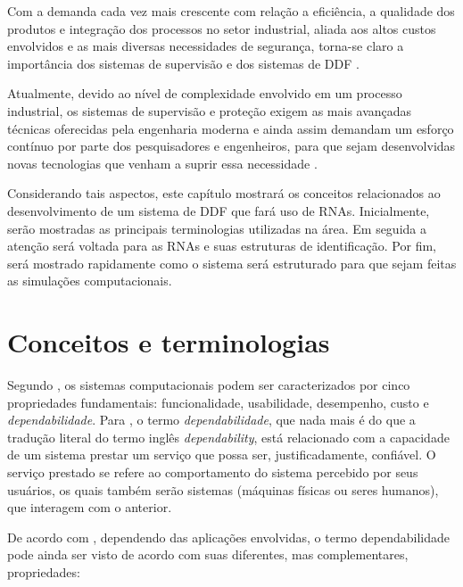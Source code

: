 \label{cap:aspectos}

Com a demanda cada vez mais crescente com relação a eficiência, a qualidade dos
produtos e integração dos processos no setor industrial, aliada aos altos custos
envolvidos e as mais diversas necessidades de segurança, torna-se claro a
importância dos sistemas de supervisão e dos sistemas de DDF
\cite{isermann:2006}.

Atualmente, devido ao nível de complexidade envolvido em um processo industrial,
os sistemas de supervisão e proteção exigem as mais avançadas técnicas
oferecidas pela engenharia moderna e ainda assim demandam um esforço contínuo
por parte dos pesquisadores e engenheiros, para que sejam desenvolvidas novas
tecnologias que venham a suprir essa necessidade \cite{silva:2008}.

Considerando tais aspectos, este capítulo mostrará os conceitos relacionados ao
desenvolvimento de um sistema de DDF que fará uso de RNAs. Inicialmente, serão
mostradas as principais terminologias utilizadas na área. Em seguida a atenção
será voltada para as RNAs e suas estruturas de identificação. Por fim, será
mostrado rapidamente como o sistema será estruturado para que sejam feitas as
simulações computacionais.

\section{Conceitos e terminologias}\label{sec:propriedades}
Segundo , os sistemas computacionais podem ser
caracterizados por cinco propriedades fundamentais: funcionalidade, usabilidade,
desempenho, custo e {\it dependabilidade}. Para , o
termo {\it dependabilidade}, que nada mais é do que a tradução literal do termo
inglês {\it dependability}, está relacionado com a capacidade de um sistema
prestar um serviço que possa ser, justificadamente, confiável. O serviço
prestado se refere ao comportamento do sistema percebido por seus usuários, os
quais também serão sistemas (máquinas físicas ou seres humanos), que interagem
com o anterior.

De acordo com , dependendo das aplicações envolvidas, o
termo dependabilidade pode ainda ser visto de acordo com suas diferentes, mas
complementares, propriedades:

